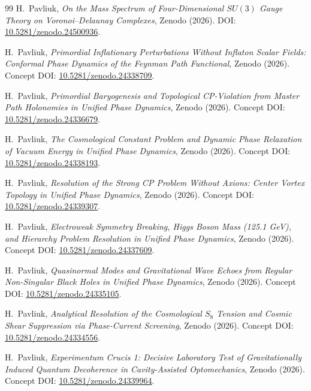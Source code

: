 \documentclass[11pt,a4paper]{article}
\theoremstyle{definition}
\begin{document}
\begin{thebibliography}{99}
H.~Pavliuk, \textit{On the Mass Spectrum of Four-Dimensional $SU(3)$ Gauge Theory on Voronoi--Delaunay Complexes}, Zenodo (2026). DOI: \href{https://doi.org/10.5281/zenodo.24500936}{10.5281/zenodo.24500936}.

H.~Pavliuk, \textit{Primordial Inflationary Perturbations Without Inflaton Scalar Fields: Conformal Phase Dynamics of the Feynman Path Functional}, Zenodo (2026). Concept DOI: \href{https://doi.org/10.5281/zenodo.24338709}{10.5281/zenodo.24338709}.

H.~Pavliuk, \textit{Primordial Baryogenesis and Topological CP-Violation from Master Path Holonomies in Unified Phase Dynamics}, Zenodo (2026). Concept DOI: \href{https://doi.org/10.5281/zenodo.24336679}{10.5281/zenodo.24336679}.

H.~Pavliuk, \textit{The Cosmological Constant Problem and Dynamic Phase Relaxation of Vacuum Energy in Unified Phase Dynamics}, Zenodo (2026). Concept DOI: \href{https://doi.org/10.5281/zenodo.24338193}{10.5281/zenodo.24338193}.

H.~Pavliuk, \textit{Resolution of the Strong CP Problem Without Axions: Center Vortex Topology in Unified Phase Dynamics}, Zenodo (2026). Concept DOI: \href{https://doi.org/10.5281/zenodo.24339307}{10.5281/zenodo.24339307}.

H.~Pavliuk, \textit{Electroweak Symmetry Breaking, Higgs Boson Mass (125.1 GeV), and Hierarchy Problem Resolution in Unified Phase Dynamics}, Zenodo (2026). Concept DOI: \href{https://doi.org/10.5281/zenodo.24337609}{10.5281/zenodo.24337609}.

H.~Pavliuk, \textit{Quasinormal Modes and Gravitational Wave Echoes from Regular Non-Singular Black Holes in Unified Phase Dynamics}, Zenodo (2026). Concept DOI: \href{https://doi.org/10.5281/zenodo.24335105}{10.5281/zenodo.24335105}.

H.~Pavliuk, \textit{Analytical Resolution of the Cosmological $S_8$ Tension and Cosmic Shear Suppression via Phase-Current Screening}, Zenodo (2026). Concept DOI: \href{https://doi.org/10.5281/zenodo.24334556}{10.5281/zenodo.24334556}.

H.~Pavliuk, \textit{Experimentum Crucis 1: Decisive Laboratory Test of Gravitationally Induced Quantum Decoherence in Cavity-Assisted Optomechanics}, Zenodo (2026). Concept DOI: \href{https://doi.org/10.5281/zenodo.24339964}{10.5281/zenodo.24339964}.


\end{thebibliography}
\end{document}
